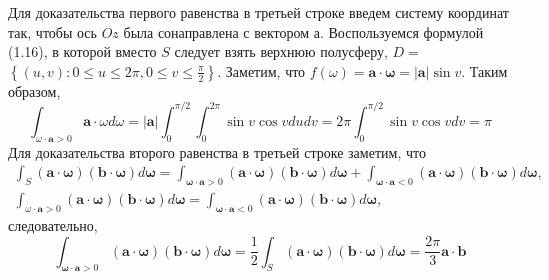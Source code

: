 Для доказательства первого равенства в третьей строке введем систему координат так, чтобы ось $O z$ была сонаправлена с вектором а. Воспользуемся формулой (1.16), в которой вместо $S$ следует взять верхнюю полусферу, $D=$ $\left\{(u, v): 0 \leqslant u \leqslant 2 \pi, 0 \leqslant v \leqslant \frac{\pi}{2}\right\}$. Заметим, что $f(\omega)=\mathbf{a} \cdot \boldsymbol{\omega}=|\mathbf{a}| \sin v$. Таким образом,
\[
    \int_{\omega \cdot \mathbf{a}>0} \mathbf{a} \cdot \omega d \omega=|\mathbf{a}|
    \int_{0}^{\pi / 2} \int_{0}^{2 \pi} \sin v \cos v d u d v=2 \pi \int_{0}^{\pi / 2} \sin v \cos v d v=\pi
\]
Для доказательства второго равенства в третьей строке заметим, что
\[
    \begin{gathered}
        \int_{S}(\mathbf{a} \cdot \boldsymbol{\omega})(\mathbf{b} \cdot \boldsymbol{\omega}) d
        \boldsymbol{\omega}=\int_{\boldsymbol{\omega} \cdot
        \mathbf{a}>0}(\mathbf{a} \cdot \boldsymbol{\omega})(\mathbf{b} \cdot \mathbf{\omega}) d
        \boldsymbol{\omega}+\int_{\boldsymbol{\omega} \cdot \mathbf{a}<0}(\mathbf{a} \cdot \boldsymbol{\omega})(\mathbf{b}
        \cdot \boldsymbol{\omega}) d \boldsymbol{\omega}, \\
        \int_{\omega \cdot \mathbf{a}>0}(\mathbf{a} \cdot \boldsymbol{\omega})(\mathbf{b} \cdot \boldsymbol{\omega}) d
        \boldsymbol{\omega}=\int_{\boldsymbol{\omega} \cdot \mathbf{a}<0}(\mathbf{a} \cdot \boldsymbol{\omega})(\mathbf{b}
        \cdot \boldsymbol{\omega}) d \boldsymbol{\omega},
    \end{gathered}
\]
следовательно,
\[
    \int_{\boldsymbol{\omega} \cdot \mathbf{a}>0}(\mathbf{a} \cdot \boldsymbol{\omega})(\mathbf{b}
    \cdot \boldsymbol{\omega}) d \boldsymbol{\omega}=\frac{1}{2} \int_{S}(\mathbf{a} \cdot \boldsymbol{\omega})(\mathbf{b}
    \cdot \boldsymbol{\omega}) d \boldsymbol{\omega}=\frac{2 \pi}{3} \mathbf{a} \cdot \mathbf{b}
\]


